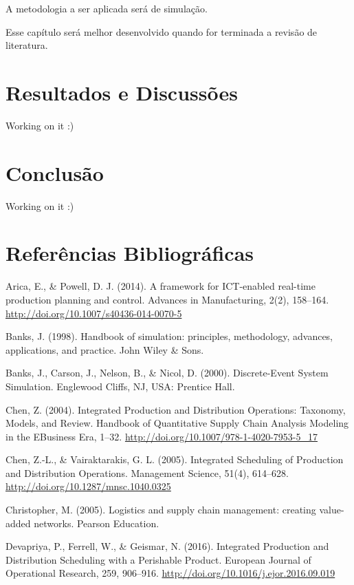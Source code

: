 \documentclass[
]{book}
\begin{document}
A metodologia a ser aplicada será de simulação.

Esse capítulo será melhor desenvolvido quando for terminada a revisão de literatura.

\hypertarget{resultados-e-discussuxf5es}{%
\chapter{Resultados e Discussões}\label{resultados-e-discussuxf5es}}

Working on it :)

\hypertarget{conclusuxe3o}{%
\chapter{Conclusão}\label{conclusuxe3o}}

Working on it :)

\hypertarget{referuxeancias-bibliogruxe1ficas}{%
\chapter*{Referências Bibliográficas}\label{referuxeancias-bibliogruxe1ficas}}

Arica, E., \& Powell, D. J. (2014). A framework for ICT-enabled real-time production planning and control. Advances in Manufacturing, 2(2), 158--164. \url{http://doi.org/10.1007/s40436-014-0070-5}

Banks, J. (1998). Handbook of simulation: principles, methodology, advances, applications, and practice. John Wiley \& Sons.

Banks, J., Carson, J., Nelson, B., \& Nicol, D. (2000). Discrete-Event System Simulation. Englewood Cliffs, NJ, USA: Prentice Hall.

Chen, Z. (2004). Integrated Production and Distribution Operations: Taxonomy, Models, and Review. Handbook of Quantitative Supply Chain Analysis Modeling in the EBusiness Era, 1--32. \url{http://doi.org/10.1007/978-1-4020-7953-5_17}

Chen, Z.-L., \& Vairaktarakis, G. L. (2005). Integrated Scheduling of Production and Distribution Operations. Management Science, 51(4), 614--628. \url{http://doi.org/10.1287/mnsc.1040.0325}

Christopher, M. (2005). Logistics and supply chain management: creating value-added networks. Pearson Education.

Devapriya, P., Ferrell, W., \& Geismar, N. (2016). Integrated Production and Distribution Scheduling with a Perishable Product. European Journal of Operational Research, 259, 906--916. \url{http://doi.org/10.1016/j.ejor.2016.09.019}
\end{document}
